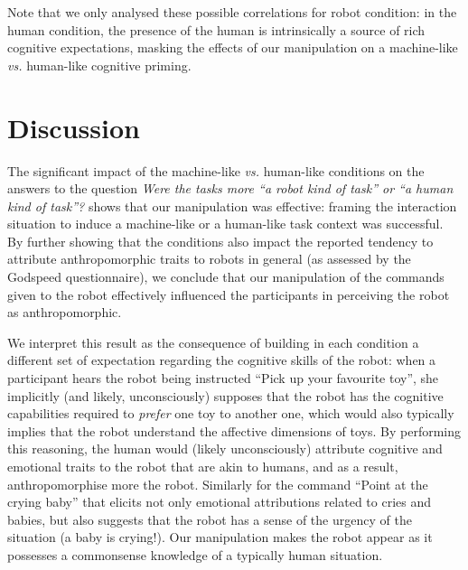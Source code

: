 \documentclass[lettersize, noapacite, twoside, HRI]{apa_HRI}
\newcommand{\vs}{\textit{vs.}\xspace}
\begin{document}
Note that we only analysed these possible correlations for robot condition: in
the human condition, the presence of the human is intrinsically a source of rich
cognitive expectations, masking the effects of our manipulation on a
machine-like \vs human-like cognitive priming.



\section{Discussion}

The significant impact of the machine-like \vs human-like conditions on the
answers to the question \emph{Were the tasks more ``a robot kind of task'' or
``a human kind of task''?} shows that our manipulation was effective: framing
the interaction situation to induce a machine-like or a human-like task context
was successful. By further showing that the conditions also impact the
reported tendency to attribute anthropomorphic traits to robots in general (as assessed by
the Godspeed questionnaire), we conclude that our manipulation of the commands
given to the robot effectively influenced the participants in perceiving the
robot as anthropomorphic.

We interpret this result as the consequence of building in each condition a
different set of expectation regarding the cognitive skills of the robot: when a
participant hears the robot being instructed ``Pick up your favourite toy'', she
implicitly (and likely, unconsciously) supposes that the robot has the cognitive
capabilities required to \emph{prefer} one toy to another one, which would also
typically implies that the robot understand the affective dimensions of toys. By
performing this reasoning, the human would (likely unconsciously) attribute
cognitive and emotional traits to the robot that are akin to humans, and as a
result, anthropomorphise more the robot. Similarly for the command ``Point at
the crying baby'' that elicits not only emotional attributions related to cries
and babies, but also suggests that the robot has a sense of the urgency of
the situation (a baby is crying!). Our manipulation makes the robot appear as it
possesses a commonsense knowledge of a typically human situation.
\end{document}
